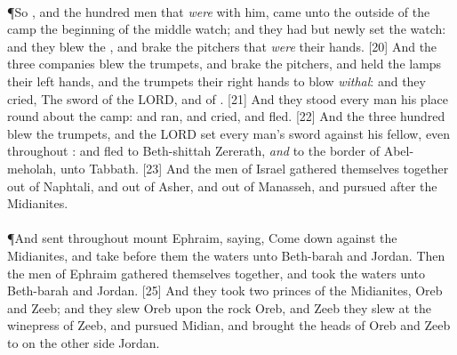 \\
\P \textcolor[cmyk]{0.99998,1,0,0}{So , and the hundred men that \emph{were} with him, came unto the outside of the camp  the beginning of the middle watch; and they had but newly set the watch: and they blew the , and brake the pitchers that \emph{were}  their hands.}
[20] \textcolor[cmyk]{0.99998,1,0,0}{And the three companies blew the trumpets, and brake the pitchers, and held the lamps  their left hands, and the trumpets  their right hands to blow \emph{withal}: and they cried, The sword of the LORD, and of .}
[21] \textcolor[cmyk]{0.99998,1,0,0}{And they stood every man  his place round about the camp: and   ran, and cried, and fled.}
[22] \textcolor[cmyk]{0.99998,1,0,0}{And the three hundred blew the trumpets, and the LORD set every man's sword against his fellow, even throughout  : and  fled to Beth-shittah  Zererath, \emph{and} to the border of Abel-meholah, unto Tabbath.}
[23] \textcolor[cmyk]{0.99998,1,0,0}{And the men of Israel gathered themselves together out of Naphtali, and out of Asher, and out of  Manasseh, and pursued after the Midianites.}\\
\\
\P \textcolor[cmyk]{0.99998,1,0,0}{And  sent  throughout  mount Ephraim, saying, Come down against the Midianites, and take before them the waters unto Beth-barah and Jordan. Then  the men of Ephraim gathered themselves together, and took the waters unto Beth-barah and Jordan.}
[25] \textcolor[cmyk]{0.99998,1,0,0}{And they took two princes of the Midianites, Oreb and Zeeb; and they slew Oreb upon the rock Oreb, and Zeeb they slew at the winepress of Zeeb, and pursued Midian, and brought the heads of Oreb and Zeeb to  on the other side Jordan.}